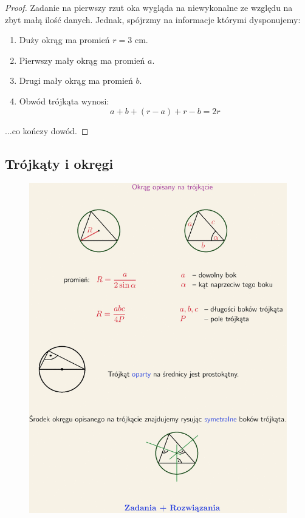 \documentclass[11pt]{article}
\theoremstyle{definition}
\numberwithin{zad}{section}
\begin{document}
\begin{proof}
Zadanie na pierwszy rzut oka wygląda na niewykonalne ze względu na zbyt małą ilość danych. Jednak, spójrzmy na informacje którymi dysponujemy:

\begin{enumerate}
\item Duży okrąg ma promień $r = 3$ cm.
\item Pierwszy mały okrąg ma promień $a$.
\item Drugi mały okrąg ma promień $b$.
\item Obwód trójkąta wynosi:
$$a+b + (r-a) + r-b = 2r$$
\end{enumerate}
...co kończy dowód.
\end{proof}

\subsection{Trójkąty i okręgi}

\begin{figure}[H]
\centering
\includegraphics[width=0.8\linewidth]{circle1.png}
\end{figure}
\end{document}

